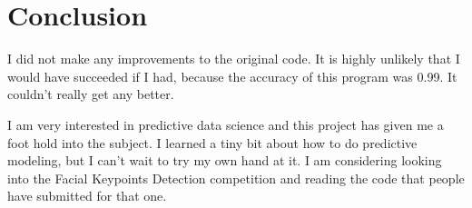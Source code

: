 \documentclass{article}
\begin{document}
\section{Conclusion}

I did not make any improvements to the original code. It is highly unlikely that I would have succeeded if I had, because the accuracy of this program was 0.99. It couldn't really get any better.

I am very interested in predictive data science and this project has given me a foot hold into the subject. I learned a tiny bit about how to do predictive modeling, but I can't wait to try my own hand at it. I am considering looking into the Facial Keypoints Detection competition and reading the code that people have submitted for that one.



\end{document}
